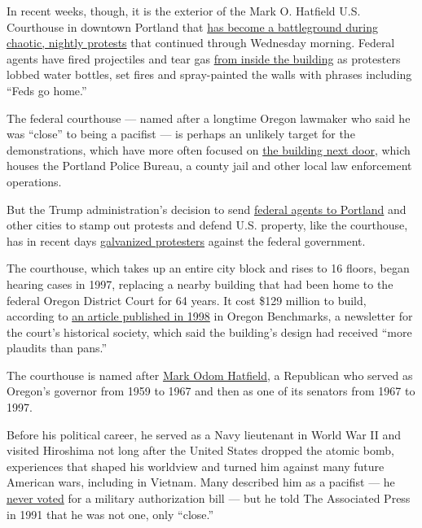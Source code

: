 In recent weeks, though, it is the exterior of the Mark O. Hatfield U.S.
Courthouse in downtown Portland that
\href{https://www.nytimes.com/2020/07/21/us/portland-protests.html}{has
become a battleground during chaotic, nightly protests} that continued
through Wednesday morning. Federal agents have fired projectiles and
tear gas
\href{https://twitter.com/ByMikeBaker/status/1285490693486473216?s=20}{from
inside the building} as protesters lobbed water bottles, set fires and
spray-painted the walls with phrases including ``Feds go home.''

The federal courthouse --- named after a longtime Oregon lawmaker who
said he was ``close'' to being a pacifist --- is perhaps an unlikely
target for the demonstrations, which have more often focused on
\href{https://www.oregonlive.com/news/2020/06/portlands-justice-center-fence-a-daunting-place-after-dark-for-both-protesters-and-police.html}{the
building next door}, which houses the Portland Police Bureau, a county
jail and other local law enforcement operations.

But the Trump administration's decision to send
\href{https://www.nytimes.com/2020/07/29/us/protests-portland-federal-withdrawal.html}{federal
agents to Portland} and other cities to stamp out protests and defend
U.S. property, like the courthouse, has in recent days
\href{https://www.nytimes.com/2020/07/20/us/portland-protests-navy-christopher-david.html}{galvanized
protesters} against the federal government.

The courthouse, which takes up an entire city block and rises to 16
floors, began hearing cases in 1997, replacing a nearby building that
had been home to the federal Oregon District Court for 64 years. It cost
\$129 million to build, according to
\href{https://usdchs.org/wp-content/uploads/2020/03/1998-Spring-Oregon-Benchmarks.pdf}{an
article published in 1998} in Oregon Benchmarks, a newsletter for the
court's historical society, which said the building's design had
received ``more plaudits than pans.''

The courthouse is named after
\href{https://www.nytimes.com/2011/08/08/us/politics/08hatfield.html}{Mark
Odom Hatfield}, a Republican who served as Oregon's governor from 1959
to 1967 and then as one of its senators from 1967 to 1997.

Before his political career, he served as a Navy lieutenant in World War
II and visited Hiroshima not long after the United States dropped the
atomic bomb, experiences that shaped his worldview and turned him
against many future American wars, including in Vietnam. Many described
him as a pacifist --- he
\href{https://www.senate.gov/senators/FeaturedBios/Featured_Bio_HatfieldMark.htm}{never
voted} for a military authorization bill --- but he told The Associated
Press in 1991 that he was not one, only ``close.''

